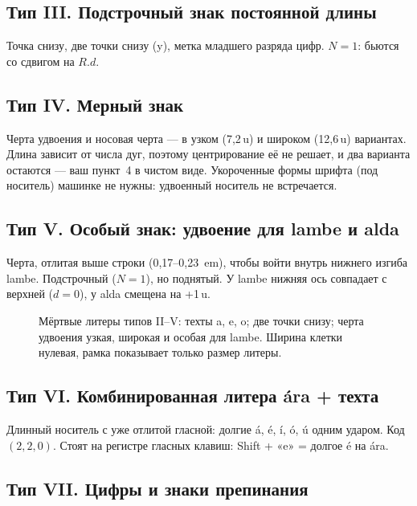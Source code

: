 \documentclass[11pt,a4paper]{article}
\newlength\tgem \setlength\tgem{5mm}
\newcommand\tgu{0.001\tgem}
\begin{document}
\subsection*{Тип III. Подстрочный знак постоянной длины}

Точка снизу, две точки снизу (y), метка младшего разряда цифр. $N = 1$: бьются со сдвигом на $R.d$.

\subsection*{Тип IV. Мерный знак}

Черта удвоения и носовая черта — в узком (7,2\,u) и широком (12,6\,u) вариантах. Длина зависит от числа дуг, поэтому центрирование её не решает, и два варианта остаются — ваш пункт~4 в чистом виде. Укороченные формы шрифта (под носитель) машинке не нужны: удвоенный носитель не встречается.

\subsection*{Тип V. Особый знак: удвоение для lambe и alda}

Черта, отлитая выше строки (0,17--0,23~em), чтобы войти внутрь нижнего изгиба lambe. Подстрочный ($N=1$), но поднятый. У lambe нижняя ось совпадает с верхней ($d=0$), у alda смещена на +1\,u.

\begin{figure}[h]
\centering
\setlength\tgem{24mm}
\begin{tikzpicture}[x=\tgu,y=\tgu]

\end{tikzpicture}
\caption{Мёртвые литеры типов II--V: техты a, e, o; две точки снизу; черта удвоения узкая, широкая и особая для lambe. Ширина клетки нулевая, рамка показывает только размер литеры.}
\end{figure}

\subsection*{Тип VI. Комбинированная литера ára + техта}

Длинный носитель с уже отлитой гласной: долгие á, é, í, ó, ú одним ударом. Код $(2, 2, 0)$. Стоят на регистре гласных клавиш: Shift + «e» = долгое é на ára.

\subsection*{Тип VII. Цифры и знаки препинания}
\end{document}
